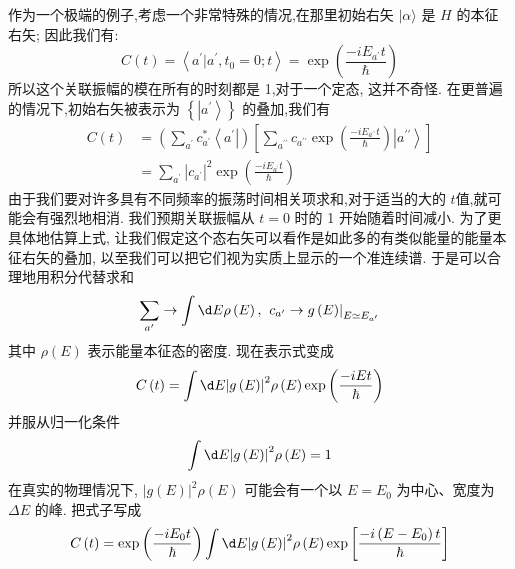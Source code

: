 \documentclass[lang=cn,newtx,10pt,scheme=chinese,thmcnt=section]{elegantbook}
\begin{document}
作为一个极端的例子,考虑一个非常特殊的情况,在那里初始右矢 $|\alpha \rangle$ 是 $H$ 的本征右矢; 因此我们有:
\begin{equation}
	C\left( t\right) = \left\langle {{a}^{\prime } | {a}^{\prime },{t}_{0} = 0;t}\right\rangle = \exp \left( \frac{-i{E}_{{a}^{\prime }}t}{\hbar }\right)
\end{equation}
所以这个关联振幅的模在所有的时刻都是 1,对于一个定态, 这并不奇怪. 在更普遍的情况下,初始右矢被表示为 $\left\{ \left| {a}^{\prime }\right\rangle \right\}$ 的叠加,我们有
\begin{equation}
	\begin{aligned}
		C\left( t\right) &= \left( {\mathop{\sum }\limits_{{a}^{\prime }}{c}_{{a}^{\prime }}^{ * }\left\langle {a}^{\prime }\right| }\right) \left\lbrack {\mathop{\sum }\limits_{{a}^{\prime \prime }}{c}_{{a}^{\prime \prime }}\exp \left( \frac{-i{E}_{{a}^{\prime \prime }}t}{\hbar }\right) \left| {a}^{\prime \prime }\right\rangle }\right\rbrack\\
		&= \mathop{\sum }\limits_{{a}^{\prime }}{\left| {c}_{{a}^{\prime }}\right| }^{2}\exp \left( \frac{-i{E}_{{a}^{\prime }}t}{\hbar }\right)
	\end{aligned}
\end{equation}
由于我们要对许多具有不同频率的振荡时间相关项求和,对于适当的大的 $t$值,就可能会有强烈地相消. 我们预期关联振幅从 $t = 0$ 时的 1 开始随着时间减小.
为了更具体地估算上式, 让我们假定这个态右矢可以看作是如此多的有类似能量的能量本征右矢的叠加, 以至我们可以把它们视为实质上显示的一个准连续谱. 于是可以合理地用积分代替求和
\begin{equation}
	\mathop{\sum }\limits_{{a}^{\prime }} \rightarrow \int {\d E\rho }\left( E\right) ,{\left. \;{c}_{{a}^{\prime }} \rightarrow g\left( E\right) \right| }_{E \simeq {E}_{{a}^{\prime }}}
\end{equation}
其中 $\rho \left( E\right)$ 表示能量本征态的密度. 现在表示式变成
\begin{equation}
	C\left( t\right) = \int {\d E}{\left| g\left( E\right) \right| }^{2}\rho \left( E\right) \exp \left( \frac{-{iEt}}{\hbar }\right)
\end{equation}
并服从归一化条件
\begin{equation}
	\int {\d E}{\left| g\left( E\right) \right| }^{2}\rho \left( E\right) = 1
\end{equation}
在真实的物理情况下, ${\left| g\left( E\right) \right| }^{2}\rho \left( E\right)$ 可能会有一个以 $E = {E}_{0}$ 为中心、宽度为 ${\Delta E}$ 的峰. 把式子写成
\begin{equation}
	C\left( t\right) = \exp \left( \frac{-i{E}_{0}t}{\hbar }\right) \int {\d E}{\left| g\left( E\right) \right| }^{2}\rho \left( E\right) \exp \left\lbrack \frac{-i\left( {E - {E}_{0}}\right) t}{\hbar }\right\rbrack
\end{equation}
\end{document}
